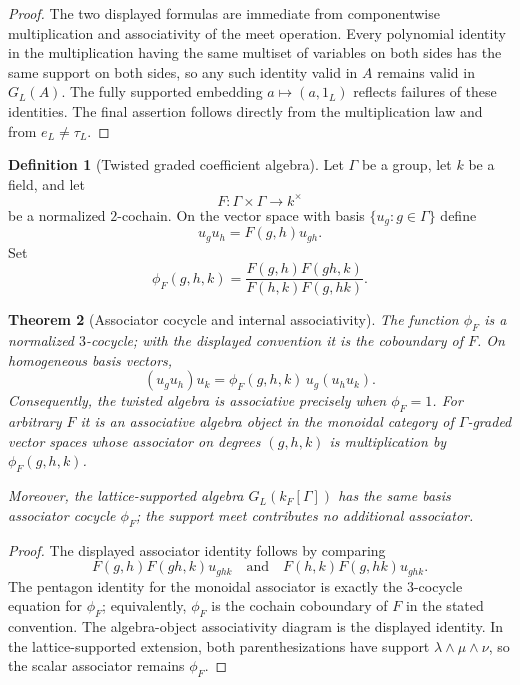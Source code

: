 \documentclass[11pt]{amsart}
\numberwithin{equation}{section}
\newtheorem{theorem}{Theorem}[section]
\theoremstyle{definition}
\newtheorem{definition}[theorem]{Definition}
\begin{document}
\begin{proof}
The two displayed formulas are immediate from componentwise multiplication
and associativity of the meet operation.  Every polynomial identity in the
multiplication having the same multiset of variables on both sides has the
same support on both sides, so any such identity valid in $A$ remains valid
in $G_L(A)$.  The fully supported embedding $a\mapsto(a,1_L)$ reflects
failures of these identities.  The final assertion follows directly from
the multiplication law and from $e_L\neq\tau_L$.
\end{proof}

\begin{definition}[Twisted graded coefficient algebra]
Let $\Gamma$ be a group, let $k$ be a field, and let
\[
F:\Gamma\times\Gamma\longrightarrow k^\times
\]
be a normalized $2$-cochain.  On the vector space with basis
$\{u_g:g\in\Gamma\}$ define
\[
u_gu_h=F(g,h)u_{gh}.
\]
Set
\[
\phi_F(g,h,k)
=
\frac{F(g,h)F(gh,k)}{F(h,k)F(g,hk)}.
\]
\end{definition}

\begin{theorem}[Associator cocycle and internal associativity]
\label{thm:associator-cocycle}
The function $\phi_F$ is a normalized $3$-cocycle; with the displayed
convention it is the coboundary of $F$.  On homogeneous basis vectors,
\[
(u_gu_h)u_k
=\phi_F(g,h,k)\,u_g(u_hu_k).
\]
Consequently, the twisted algebra is associative precisely when
$\phi_F=1$.  For arbitrary $F$ it is an associative algebra object in the
monoidal category of $\Gamma$-graded vector spaces whose associator on
degrees $(g,h,k)$ is multiplication by $\phi_F(g,h,k)$.

Moreover, the lattice-supported algebra $G_L(k_F[\Gamma])$ has the same
basis associator cocycle $\phi_F$; the support meet contributes no
additional associator.
\end{theorem}

\begin{proof}
The displayed associator identity follows by comparing
\[
F(g,h)F(gh,k)u_{ghk}
\quad\text{and}\quad
F(h,k)F(g,hk)u_{ghk}.
\]
The pentagon identity for the monoidal associator is exactly the
$3$-cocycle equation for $\phi_F$; equivalently, $\phi_F$ is the
cochain coboundary of $F$ in the stated convention.  The algebra-object
associativity diagram is the displayed identity.  In the
lattice-supported extension, both parenthesizations have support
$\lambda\wedge\mu\wedge\nu$, so the scalar associator remains
$\phi_F$.
\end{proof}
\end{document}
